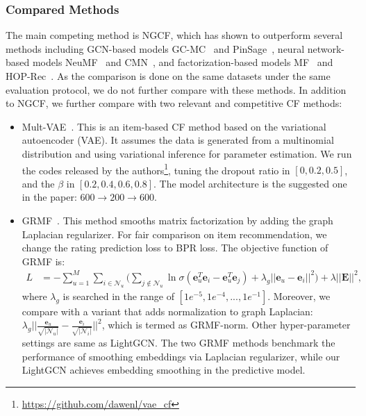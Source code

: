 \documentclass[sigconf]{acmart}
\theoremstyle{definition}
\begin{document}
\subsubsection{Compared Methods} The main competing method is NGCF, which has shown to outperform several methods including GCN-based models GC-MC~\cite{GC-MC} and PinSage~\cite{PinSage}, neural network-based models NeuMF~\cite{NCF} and CMN~\cite{CMN}, and factorization-based models MF~\cite{BPRMF} and HOP-Rec~\cite{HOP-rec}.
As the comparison is done on the same datasets under the same evaluation protocol, we do not further compare with these methods. In addition to NGCF, we further compare with two relevant and competitive CF methods:
\begin{itemize}[leftmargin=*]
\item Mult-VAE~\cite{VACF}. This is an item-based CF method based on the variational autoencoder (VAE). 
It assumes the data is generated from a multinomial distribution and using variational inference for parameter estimation. 
We run the codes released by the authors\footnote{\url{https://github.com/dawenl/vae_cf}}, tuning the dropout ratio in $[0, 0.2, 0.5]$, and the $\beta$ in $[0.2,0.4,0.6,0.8]$. The model architecture is the suggested one in the paper: $600\rightarrow 200 \rightarrow 600$. 
\item GRMF~\cite{rao2015collaborative}. This method smooths matrix factorization by adding the graph Laplacian regularizer.
For fair comparison on item recommendation, we change the rating prediction loss to BPR loss. The objective function of GRMF is:
\begin{equation}
\begin{aligned}
    L &= - \sum_{u=1}^{M} \sum_{i \in \mathcal{N}_u} \Big(\sum_{j \notin \mathcal{N}_u} \ln \sigma (\textbf{e}_u^T \textbf{e}_i - \textbf{e}_u^T \textbf{e}_j ) + \lambda_{g} ||\textbf{e}_u - \textbf{e}_i||^2 \Big)+ \lambda ||\textbf{E}||^2,
\end{aligned}
\end{equation}
where $\lambda_g$ is searched in the range of $[1e^{-5}, 1e^{-4}, ..., 1e^{-1}]$. 
Moreover, we compare with a variant that adds normalization to graph Laplacian: $\lambda_{g} ||\frac{\textbf{e}_u}{\sqrt{|\mathcal{N}_u|}} - \frac{\textbf{e}_i}{\sqrt{|\mathcal{N}_i|}}||^2$, which is termed as GRMF-norm. 
Other hyper-parameter settings are same as LightGCN. 
The two GRMF methods benchmark the performance of smoothing embeddings via Laplacian regularizer, while our LightGCN achieves embedding smoothing in the predictive model. 
\end{itemize}
\end{document}
